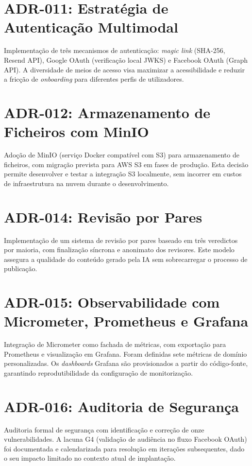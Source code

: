 \section*{ADR-011: Estratégia de Autenticação Multimodal}
Implementação de três mecanismos de autenticação: \textit{magic link} (SHA-256, Resend API), Google OAuth (verificação local JWKS) e Facebook OAuth (Graph API). A diversidade de meios de acesso visa maximizar a acessibilidade e reduzir a fricção de \textit{onboarding} para diferentes perfis de utilizadores.

\section*{ADR-012: Armazenamento de Ficheiros com MinIO}
Adoção de MinIO (serviço Docker compatível com S3) para armazenamento de ficheiros, com migração prevista para AWS S3 em fases de produção. Esta decisão permite desenvolver e testar a integração S3 localmente, sem incorrer em custos de infraestrutura na nuvem durante o desenvolvimento.

\section*{ADR-014: Revisão por Pares}
Implementação de um sistema de revisão por pares baseado em três veredictos por maioria, com finalização síncrona e anonimato dos revisores. Este modelo assegura a qualidade do conteúdo gerado pela IA sem sobrecarregar o processo de publicação.

\section*{ADR-015: Observabilidade com Micrometer, Prometheus e Grafana}
Integração de Micrometer como fachada de métricas, com exportação para Prometheus e visualização em Grafana. Foram definidas sete métricas de domínio personalizadas. Os \textit{dashboards} Grafana são provisionados a partir do código-fonte, garantindo reprodutibilidade da configuração de monitorização.

\section*{ADR-016: Auditoria de Segurança}
Auditoria formal de segurança com identificação e correção de onze vulnerabilidades. A lacuna G4 (validação de audiência no fluxo Facebook OAuth) foi documentada e calendarizada para resolução em iterações subsequentes, dado o seu impacto limitado no contexto atual de implantação.

